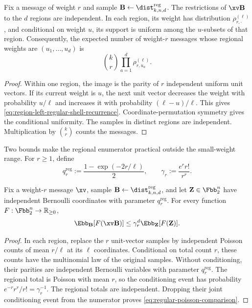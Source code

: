 \begin{lemma}
\label{lem:region-left-regular-shell-law}
Fix a message of weight $r$ and sample
$\B\gets\dist^{\mathrm{reg}}_{k,n,d}$.  The restrictions of $\xv\B$ to the
$d$ regions are independent.  In each region, its weight has distribution
$\rho^{(\ell)}_{r,\cdot}$, and conditional on weight $u$, its support is
uniform among the $u$-subsets of that region.  Consequently, the expected
number of weight-$r$ messages whose regional weights are
$(u_1,\ldots,u_d)$ is
\begin{equation}
 \boxed{
 \binom{k}{r}\prod_{a=1}^{d}\rho^{(\ell)}_{r,u_a}.
 }
 \label{eq:region-left-regular-enumerator}
\end{equation}
\end{lemma}

\begin{proof}
Within one region, the image is the parity of $r$ independent uniform unit
vectors.  If its current weight is $u$, the next unit vector decreases the
weight with probability $u/\ell$ and increases it with probability
$(\ell-u)/\ell$.  This gives
\eqref{eq:region-left-regular-shell-recurrence}.  Coordinate-permutation
symmetry gives the conditional uniformity.  The samples in distinct regions
are independent.  Multiplication by $\binom{k}{r}$ counts the messages.
\end{proof}

Two bounds make the regional enumerator practical outside the small-weight
range.  For $r\geq1$, define
\begin{equation}
 q^{\mathrm{reg}}_r
 :=\frac{1-\exp(-2r/\ell)}{2},
 \qquad
 \gamma_r:=\frac{e^r r!}{r^r}.
 \label{eq:regular-poisson-parameters}
\end{equation}

\begin{lemma}
\label{lem:regular-poisson-comparison}
Fix a weight-$r$ message $\xv$, sample
$\B\gets\dist^{\mathrm{reg}}_{k,n,d}$, and let
$\mathbf Z\in\Fbb_2^n$ have independent Bernoulli coordinates with parameter
$q^{\mathrm{reg}}_r$.  For every function
$F:\Fbb_2^n\to\mathbb R_{\geq0}$,
\begin{equation}
 \Ebb_{\B}[F(\xv\B)]
 \leq\gamma_r^d\Ebb_{\mathbf Z}[F(\mathbf Z)].
 \label{eq:regular-poisson-comparison}
\end{equation}
\end{lemma}

\begin{proof}
In each region, replace the $r$ unit-vector samples by independent Poisson
counts of mean $r/\ell$ at its $\ell$ coordinates.  Conditional on total count
$r$, these counts have the multinomial law of the original samples.  Without
conditioning, their parities are independent Bernoulli variables with
parameter $q^{\mathrm{reg}}_r$.  The regional total is Poisson with mean $r$,
so the conditioning event has probability
$e^{-r}r^r/r!=\gamma_r^{-1}$.  The regional totals are independent.  Dropping
their joint conditioning event from the numerator proves
\eqref{eq:regular-poisson-comparison}.
\end{proof}

